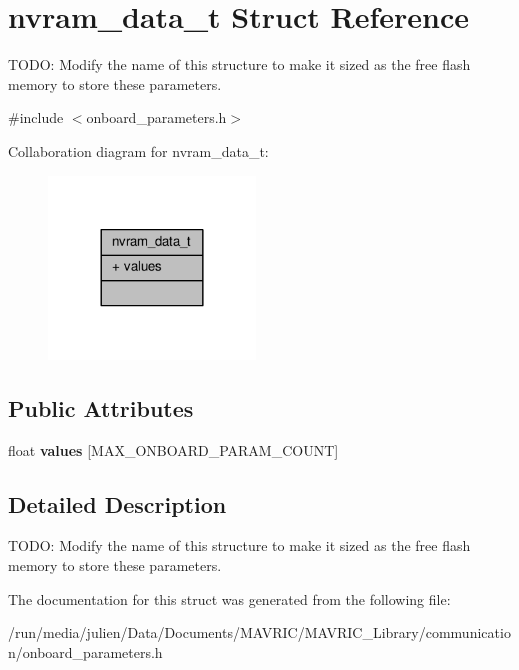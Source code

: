 \hypertarget{structnvram__data__t}{\section{nvram\+\_\+data\+\_\+t Struct Reference}
\label{structnvram__data__t}
}


T\+O\+D\+O\+: Modify the name of this structure to make it sized as the free flash memory to store these parameters.  




{\ttfamily \#include $<$onboard\+\_\+parameters.\+h$>$}



Collaboration diagram for nvram\+\_\+data\+\_\+t\+:
\nopagebreak
\begin{figure}[H]
\begin{center}
\leavevmode
\includegraphics[width=156pt]{structnvram__data__t__coll__graph}
\end{center}
\end{figure}
\subsection*{Public Attributes}
\begin{DoxyCompactItemize}
\item 
\hypertarget{structnvram__data__t_a6bc3b8ddcca5d998dd7c3f0c6f44e738}{float {\bfseries values} \mbox{[}M\+A\+X\+\_\+\+O\+N\+B\+O\+A\+R\+D\+\_\+\+P\+A\+R\+A\+M\+\_\+\+C\+O\+U\+N\+T\mbox{]}}\label{structnvram__data__t_a6bc3b8ddcca5d998dd7c3f0c6f44e738}

\end{DoxyCompactItemize}


\subsection{Detailed Description}
T\+O\+D\+O\+: Modify the name of this structure to make it sized as the free flash memory to store these parameters. 

The documentation for this struct was generated from the following file\+:\begin{DoxyCompactItemize}
\item 
/run/media/julien/\+Data/\+Documents/\+M\+A\+V\+R\+I\+C/\+M\+A\+V\+R\+I\+C\+\_\+\+Library/communication/onboard\+\_\+parameters.\+h\end{DoxyCompactItemize}
